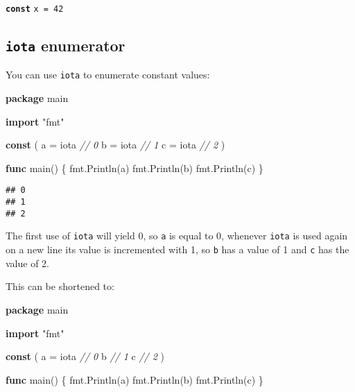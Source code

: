 \documentclass[]{book}
\newenvironment{Shaded}{\begin{snugshade}}{\end{snugshade}}
\newcommand{\CommentTok}[1]{\textcolor[rgb]{0.56,0.35,0.01}{\textit{#1}}}
\newcommand{\KeywordTok}[1]{\textcolor[rgb]{0.13,0.29,0.53}{\textbf{#1}}}
\newcommand{\NormalTok}[1]{#1}
\newcommand{\OtherTok}[1]{\textcolor[rgb]{0.56,0.35,0.01}{#1}}
\newcommand{\StringTok}[1]{\textcolor[rgb]{0.31,0.60,0.02}{#1}}
\begin{document}
\textbf{\texttt{const}} \texttt{x\ =\ 42}

\hypertarget{iota-enumerator}{%
\subsection{\texorpdfstring{\texttt{iota} enumerator}{iota enumerator}}\label{iota-enumerator}}

You can use \texttt{iota} to enumerate constant values:

\begin{Shaded}
\begin{Highlighting}[]
\KeywordTok{package}\NormalTok{ main}

\KeywordTok{import} \StringTok{"fmt"}

\KeywordTok{const}\NormalTok{ (}
\NormalTok{    a = }\OtherTok{iota} \CommentTok{// 0}
\NormalTok{    b = }\OtherTok{iota} \CommentTok{// 1}
\NormalTok{    c = }\OtherTok{iota} \CommentTok{// 2}
\NormalTok{)}

\KeywordTok{func}\NormalTok{ main() \{}
\NormalTok{    fmt.Println(a)}
\NormalTok{    fmt.Println(b)}
\NormalTok{    fmt.Println(c)}
\NormalTok{\}}
\end{Highlighting}
\end{Shaded}

\begin{verbatim}
## 0
## 1
## 2
\end{verbatim}

The first use of \texttt{iota} will yield 0, so \texttt{a} is equal to 0, whenever \texttt{iota} is
used again on a new line its value is incremented with 1, so \texttt{b} has a value of
1 and \texttt{c} has the value of 2.

This can be shortened to:

\begin{Shaded}
\begin{Highlighting}[]
\KeywordTok{package}\NormalTok{ main}

\KeywordTok{import} \StringTok{"fmt"}

\KeywordTok{const}\NormalTok{ (}
\NormalTok{    a = }\OtherTok{iota} \CommentTok{// 0}
\NormalTok{    b        }\CommentTok{// 1}
\NormalTok{    c        }\CommentTok{// 2}
\NormalTok{)}

\KeywordTok{func}\NormalTok{ main() \{}
\NormalTok{    fmt.Println(a)}
\NormalTok{    fmt.Println(b)}
\NormalTok{    fmt.Println(c)}
\NormalTok{\}}
\end{Highlighting}
\end{Shaded}
\end{document}
